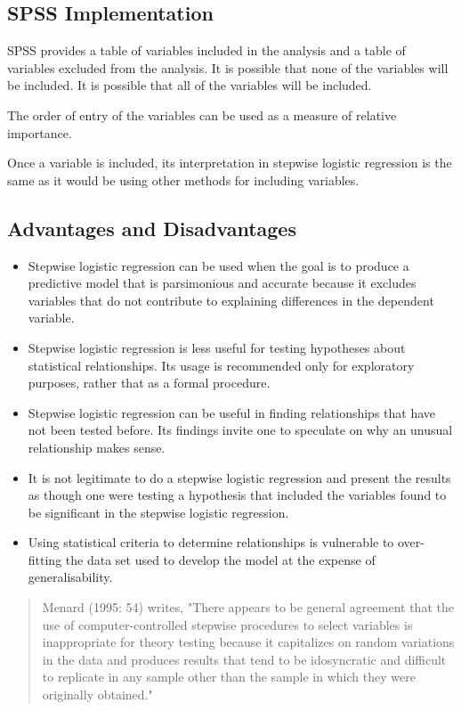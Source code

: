 \documentclass[a4paper,12pt]{article}
\begin{document}
\subsection{SPSS Implementation}
SPSS provides a table of variables included in the analysis and a table of variables excluded from the analysis.  It is possible that none of the variables will be included.  It is possible that all of the variables will be included.

The order of entry of the variables can be used as a measure of relative importance.

Once a variable is included, its interpretation in stepwise logistic regression is the same as it would be using other methods for including variables.
\subsection{Advantages and Disadvantages}
\begin{itemize}
	\item Stepwise logistic regression can be used when the goal is to produce a predictive model that is parsimonious and accurate because it excludes variables that do not contribute to explaining differences in the dependent variable.
	
\item Stepwise logistic regression is less useful for testing hypotheses about statistical relationships. Its usage is recommended only for exploratory purposes, rather that as a formal procedure.
	
\item Stepwise logistic regression can be useful in finding relationships that have not been tested before. Its findings invite one to speculate on why an unusual relationship makes sense.
	
\item It is not legitimate to do a stepwise logistic regression and present the results as though one were testing a hypothesis that included the variables found to be significant in the stepwise logistic regression.
	
\item Using statistical criteria to determine relationships is vulnerable to over-fitting the data set used to develop the model at the expense of generalisability.
\end{itemize}


\begin{quote}
	Menard (1995: 54) writes, "There appears to be general agreement that the use of computer-controlled stepwise procedures to select variables is inappropriate for theory testing because it capitalizes on random variations in the data and produces results that tend to be idosyncratic and difficult to replicate in any sample other than the sample in which they were originally obtained."
\end{quote}
\end{document}
